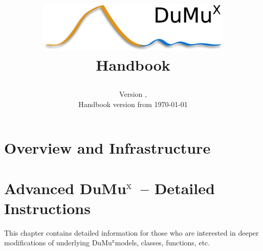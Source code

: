 \documentclass[11pt,a4paper,headinclude,footinclude,DIV16]{scrreprt}
\title{
\begin{center}
\includegraphics[width=0.7\textwidth]{../logo/dumux_logo_hires_whitebg.png}
\\[3cm]
{\Huge Handbook}
\end{center}
}
\author{}
\date{Version \DumuxVersion, \\
Handbook version from \today}
\newcommand{\Dumux}{\texorpdfstring{Du\-Mu$^\text{x}$\xspace}{DuMuX\xspace}}
\begin{document}
\maketitle

\setcounter{tocdepth}{1}
\tableofcontents
\newpage

\chapter{Overview and Infrastructure}





\chapter{Advanced \Dumux\ -- Detailed Instructions}
This chapter contains detailed information for those who are interested
in deeper modifications of underlying \Dumux models, classes, functions, etc.




\end{document}
